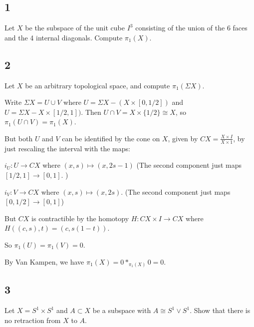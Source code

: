 \hypertarget{section-14}{%
\subsection{1}\label{section-14}}

Let \(X\) be the subspace of the unit cube \(I^3\) consisting of the
union of the 6 faces and the 4 internal diagonals. Compute \(\pi_1(X)\).

\hypertarget{section-15}{%
\subsection{2}\label{section-15}}

Let \(X\) be an arbitrary topological space, and compute
\(\pi_1(\Sigma X)\).

\begin{solution}

Write \(\Sigma X = U \cup V\) where \(U = \Sigma X - (X\times[0,1/2])\)
and \(U = \Sigma X - X\times[1/2, 1])\). Then
\(U\cap V = X \times\{1/2\} \cong X\), so \(\pi_1(U\cap V) =\pi_1(X)\).

But both \(U\) and \(V\) can be identified by the cone on \(X\), given
by \(CX = \frac{X \times I}{X \times 1}\), by just rescaling the
interval with the maps:

\(i_U: U \to CX\) where \((x,s) \mapsto (x, 2s-1)\) (The second
component just maps \([1/2, 1] \to[0,1]\). )

\(i_V: V \to CX\) where \((x, s) \mapsto (x, 2s)\). (The second
component just maps \([0,1/2] \to [0, 1]\))

But \(CX\) is contractible by the homotopy \(H:CX \times I \to CX\)
where \(H((c,s), t) = (c, s(1-t))\).

So \(\pi_1(U) = \pi_1(V) = 0\).

By Van Kampen, we have \(\pi_1(X) = 0 \ast_{\pi_1(X)} 0 = 0.\)

\end{solution}

\hypertarget{section-16}{%
\subsection{3}\label{section-16}}

Let \(X = S^1 \times S^1\) and \(A\subset X\) be a subspace with
\(A \cong S^1 \vee S^1\). Show that there is no retraction from \(X\) to
\(A\).

